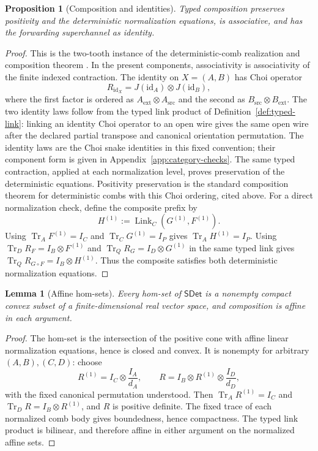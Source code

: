 \documentclass[11pt,a4paper]{article}
\theoremstyle{definition}
\theoremstyle{plain}
\newtheorem{lemma}[theorem]{Lemma}
\newtheorem{proposition}[theorem]{Proposition}
\theoremstyle{remark}
\DeclareMathOperator{\Tr}{Tr}
\newcommand{\id}{\mathrm{id}}
\newcommand{\SDet}{\mathsf{SDet}}
\begin{document}
\begin{proposition}[Composition and identities]
Typed composition preserves positivity and the deterministic normalization
equations, is associative, and has the forwarding superchannel as identity.
\end{proposition}
\begin{proof}
This is the two-tooth instance of the deterministic-comb realization and
composition theorem \cite{chiribella2009,chiribella2013}. In the present
components, associativity is associativity of the finite indexed
contraction. The identity on $X=(A,B)$ has Choi operator
\[
R_{\id_X}=J(\id_A)\otimes J(\id_B),
\]
where the first factor is ordered as
$A_{\mathrm{ext}}\otimes A_{\mathrm{src}}$ and the second as
$B_{\mathrm{src}}\otimes B_{\mathrm{ext}}$. The two identity laws follow from the typed link product of
Definition~\ref{def:typed-link}: linking an identity Choi operator to an
open wire gives the same open wire after the declared partial transpose
and canonical orientation permutation. The identity laws are the Choi
snake identities in this fixed convention; their component form is
given in Appendix~\ref{app:category-checks}. The same typed contraction,
applied at each normalization level, proves preservation of the
deterministic equations. Positivity preservation is the standard
composition theorem for deterministic combs with this Choi
ordering, cited above. For a direct normalization check, define the
composite prefix by
\[
H^{(1)}:=\operatorname{Link}_{C}(G^{(1)},F^{(1)}).
\]
Using $\Tr_A F^{(1)}=I_C$ and $\Tr_CG^{(1)}=I_P$ gives
$\Tr_AH^{(1)}=I_P$. Using
$\Tr_D R_F=I_B\otimes F^{(1)}$ and
$\Tr_Q R_G=I_D\otimes G^{(1)}$ in the same typed link gives
$\Tr_QR_{G\circ F}=I_B\otimes H^{(1)}$. Thus the composite satisfies
both deterministic normalization equations.
\end{proof}

\begin{lemma}[Affine hom-sets]
Every hom-set of $\SDet$ is a nonempty compact convex subset of a finite-dimensional real vector space, and composition is affine in each argument.
\end{lemma}
\begin{proof}
The hom-set is the intersection of the positive cone with affine linear
normalization equations, hence is closed and convex. It is nonempty for
arbitrary $(A,B),(C,D)$: choose
\[
R^{(1)}=I_C\otimes\frac{I_A}{d_A},
\qquad
R=I_B\otimes R^{(1)}\otimes\frac{I_D}{d_D},
\]
with the fixed canonical permutation understood. Then
$\Tr_A R^{(1)}=I_C$ and
$\Tr_D R=I_B\otimes R^{(1)}$, and $R$ is positive definite. The fixed
trace of each normalized comb body gives boundedness, hence compactness.
The typed link product is bilinear, and therefore affine in either
argument on the normalized affine sets.
\end{proof}
\end{document}

